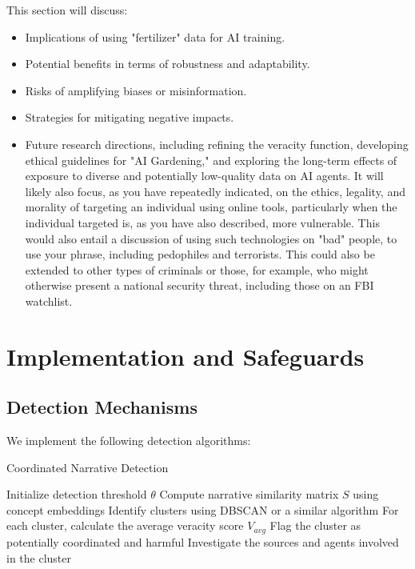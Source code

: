 \documentclass[12pt, a4paper]{article}
\begin{document}
This section will discuss:
\begin{itemize}
    \item Implications of using "fertilizer" data for AI training.
    \item Potential benefits in terms of robustness and adaptability.
    \item Risks of amplifying biases or misinformation.
    \item Strategies for mitigating negative impacts.
    \item Future research directions, including refining the veracity function, developing ethical guidelines for "AI Gardening," and exploring the long-term effects of exposure to diverse and potentially low-quality data on AI agents. It will likely also focus, as you have repeatedly indicated, on the ethics, legality, and morality of targeting an individual using online tools, particularly when the individual targeted is, as you have also described, more vulnerable. This would also entail a discussion of using such technologies on "bad" people, to use your phrase, including pedophiles and terrorists. This could also be extended to other types of criminals or those, for example, who might otherwise present a national security threat, including those on an FBI watchlist.
\end{itemize}

\section{Implementation and Safeguards}
\subsection{Detection Mechanisms}
We implement the following detection algorithms:
\begin{algorithm}[H]
\caption{Coordinated Narrative Detection}
\begin{algorithmic}[1]
\State Initialize detection threshold $\theta$
    \State Compute narrative similarity matrix $S$ using concept embeddings
    \State Identify clusters using DBSCAN or a similar algorithm
    \State For each cluster, calculate the average veracity score $V_{avg}$
        \State Flag the cluster as potentially coordinated and harmful
        \State Investigate the sources and agents involved in the cluster
    \EndIf
\EndFor
\end{algorithmic}
\end{algorithm}
\end{document}
